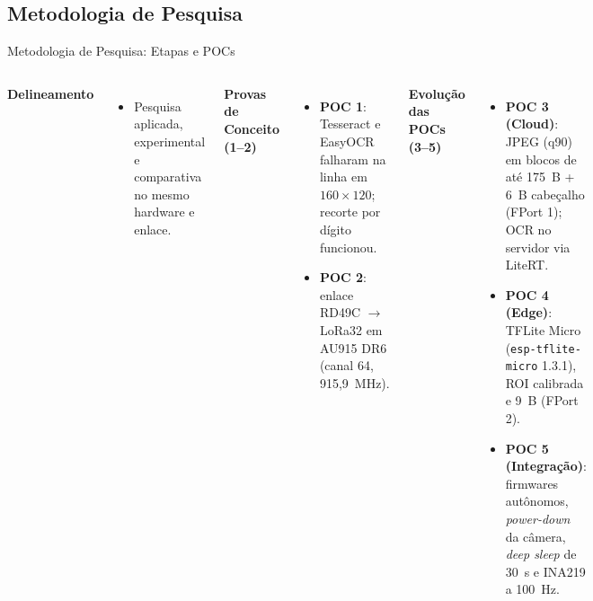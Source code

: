 \documentclass[
    aspectratio=169,
    11pt,
    brazil
]{beamer}
\begin{document}
\subsection{Metodologia de Pesquisa}
\begin{frame}{Metodologia de Pesquisa: Etapas e POCs}
  \begin{columns}[t]
    {\footnotesize\bfseries\color{senacblue}Delineamento}
    \begin{itemize}\scriptsize
      \item Pesquisa aplicada, experimental e comparativa no mesmo hardware e enlace.
    \end{itemize}
    \vspace{0.1cm}
    {\footnotesize\bfseries\color{senacblue}Provas de Conceito (1--2)}
    \begin{itemize}\scriptsize
      \item \textbf{POC 1}: Tesseract e EasyOCR falharam na linha em $160\times120$; recorte por dígito funcionou.
      \item \textbf{POC 2}: enlace RD49C $\rightarrow$ LoRa32 em AU915 DR6 (canal 64, 915,9~MHz).
    \end{itemize}
    {\footnotesize\bfseries\color{senacblue}Evolução das POCs (3--5)}
    \begin{itemize}\scriptsize
      \item \textbf{POC 3 (Cloud)}: JPEG (q90) em blocos de até 175~B + 6~B cabeçalho (FPort 1); OCR no servidor via LiteRT.
      \item \textbf{POC 4 (Edge)}: TFLite Micro (\texttt{esp-tflite-micro} 1.3.1), ROI calibrada e 9~B (FPort 2).
      \item \textbf{POC 5 (Integração)}: firmwares autônomos, \textit{power-down} da câmera, \textit{deep sleep} de 30~s e INA219 a 100~Hz.
    \end{itemize}
  \end{columns}
\end{frame}
\end{document}
